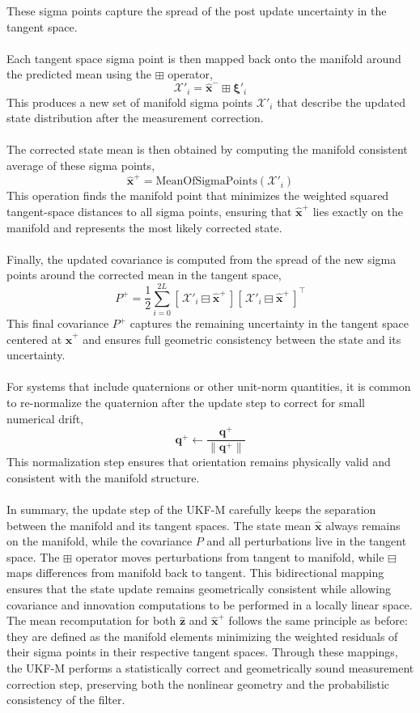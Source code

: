 These sigma points capture the spread of the post update uncertainty in the tangent space.  
\\ \\
Each tangent space sigma point is then mapped back onto the manifold around the predicted mean using the $\boxplus$ operator,
$$
    \mathcal{X}'_i = \hat{\mathbf{x}}^- \boxplus \boldsymbol{\xi}'_i
$$
This produces a new set of manifold sigma points $\mathcal{X}'_i$ that describe the updated state distribution after the measurement correction.  
\\ \\
The corrected state mean is then obtained by computing the manifold consistent average of these sigma points,
$$
    \hat{\mathbf{x}}^+ = \text{MeanOfSigmaPoints}(\mathcal{X}'_i)
$$
This operation finds the manifold point that minimizes the weighted squared tangent-space distances to all sigma points, ensuring that $\hat{\mathbf{x}}^+$ lies exactly on the manifold and represents the most likely corrected state.  
\\ \\
Finally, the updated covariance is computed from the spread of the new sigma points around the corrected mean in the tangent space,
$$
    P^+ = \frac{1}{2}\sum_{i=0}^{2L}
    [\,\mathcal{X}'_i \boxminus \hat{\mathbf{x}}^+\,]
    [\,\mathcal{X}'_i \boxminus \hat{\mathbf{x}}^+\,]^\top
$$
This final covariance $P^+$ captures the remaining uncertainty in the tangent space centered at $\hat{\mathbf{x}}^+$ and ensures full geometric consistency between the state and its uncertainty.
\\ \\
For systems that include quaternions or other unit-norm quantities, it is common to re-normalize the quaternion after the update step to correct for small numerical drift,  
$$
    \mathbf{q}^+ \leftarrow \frac{\mathbf{q}^+}{\|\mathbf{q}^+\|}
$$
This normalization step ensures that orientation remains physically valid and consistent with the manifold structure.  
\\ \\
In summary, the update step of the UKF-M carefully keeps the separation between the manifold and its tangent spaces. The state mean $\hat{\mathbf{x}}$ always remains on the manifold, while the covariance $P$ and all perturbations live in the tangent space. The $\boxplus$ operator moves perturbations from tangent to manifold, while $\boxminus$ maps differences from manifold back to tangent. This bidirectional mapping ensures that the state update remains geometrically consistent while allowing covariance and innovation computations to be performed in a locally linear space. The mean recomputation for both $\hat{\mathbf{z}}$ and $\hat{\mathbf{x}}^+$ follows the same principle as before: they are defined as the manifold elements minimizing the weighted residuals of their sigma points in their respective tangent spaces. Through these mappings, the UKF-M performs a statistically correct and geometrically sound measurement correction step, preserving both the nonlinear geometry and the probabilistic consistency of the filter.



